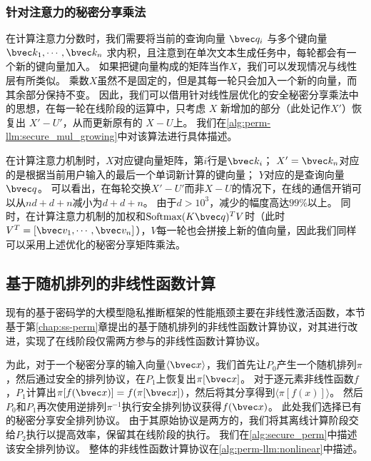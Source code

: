 \subsubsection{针对注意力的秘密分享乘法}
在计算注意力分数时，我们需要将当前的查询向量 $\bvec q_i$ 与多个键向量 $\bvec k_1, \cdots, \bvec k_n$ 求内积，且注意到在单次文本生成任务中，每轮都会有一个新的键向量加入。
%
如果把键向量构成的矩阵当作$X$，我们可以发现情况与线性层有所类似。
乘数$X$虽然不是固定的，但是其每一轮只会加入一个新的向量，而其余部分保持不变。
%
因此，我们可以借用针对线性层优化的安全秘密分享乘法中的思想，在每一轮在线阶段的运算中，只考虑 $X$ 新增加的部分（此处记作$X'$）恢复出 $X' - U'$，从而更新原有的 $X - U$上。
%
我们在\autoref{alg:perm-llm:secure_mul_growing}中对该算法进行具体描述。



在计算注意力机制时，$X$对应键向量矩阵，第$i$行是$\bvec k_i$；
$X' = \bvec k_n$对应的是根据当前用户输入的最后一个单词新计算的键向量；
%
$Y$对应的是查询向量 $\bvec q$。
%
可以看出，在每轮交换$X' - U'$而非$X - U$的情况下，在线的通信开销可以从$nd + d + n$减小为$d + d + n$。
%
由于$d > 10^3$，减少的幅度高达$99\%$以上。
%
同时，在计算注意力机制的加权和$\text{Softmax}(K\bvec q)^T V$时（此时$V^T = [\bvec v_1, \cdots, \bvec v_n]$），$V$每一轮也会拼接上新的值向量，因此我们同样可以采用上述优化的秘密分享矩阵乘法。


\subsection{基于随机排列的非线性函数计算}
现有的基于密码学的大模型隐私推断框架的性能瓶颈主要在非线性激活函数，本节基于第\ref{chap:ss-perm}章提出的基于随机排列的非线性函数计算协议，对其进行改进，实现了在线阶段仅需两方参与的非线性函数计算协议。


为此，对于一个秘密分享的输入向量$\langle \bvec x \rangle$，我们首先让$P_0$产生一个随机排列$\pi$，然后通过安全的排列协议，在$P_1$上恢复出$\pi[\bvec x]$。
对于逐元素非线性函数$f$，$P_1$计算出$\pi[f(\bvec x)] = f(\pi[\bvec x])$，然后将其分享得到$\langle \pi[f(x)] \rangle$。
%
然后$P_0$和$P_1$再次使用逆排列$\pi^{-1}$执行安全排列协议获得$f(\bvec x)$。
%
此处我们选择已有的秘密分享安全排列协议\cite{chase_2020_secret_shared_shuffle}。
由于其原始协议是两方的，我们将其离线计算阶段交给$P_2$执行以提高效率，保留其在线阶段的执行。
%
我们在\autoref{alg:secure_perm}中描述该安全排列协议。
整体的非线性函数计算协议在\autoref{alg:perm-llm:nonlinear}中描述。

